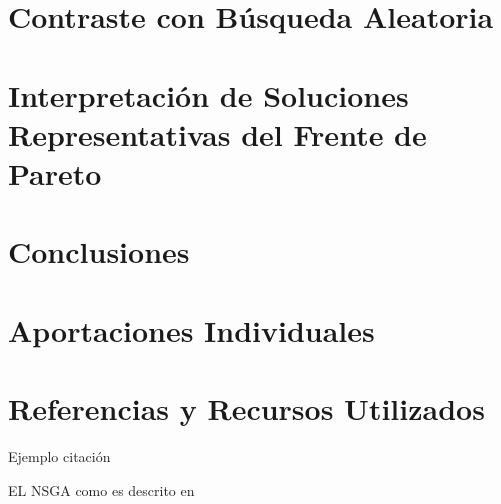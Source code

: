 \documentclass[11pt,a4paper]{article}
\begin{document}
\section{Contraste con Búsqueda Aleatoria}

\section{Interpretación de Soluciones Representativas del Frente de Pareto}

\section{Conclusiones}

\section{Aportaciones Individuales}

\section{Referencias y Recursos Utilizados}

Ejemplo citación \cite{chatterjee1999recursive}

EL NSGA como es descrito en \cite{zitzler2004tutorial}


 

\end{document}
